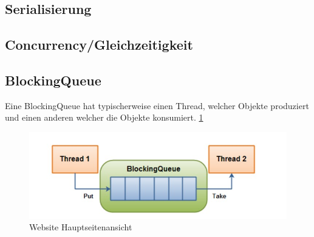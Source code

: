 

\subsection{Serialisierung}

\subsection{Concurrency/Gleichzeitigkeit}



\subsection{BlockingQueue}

Eine BlockingQueue hat typischerweise einen Thread, welcher Objekte produziert und einen anderen welcher die Objekte konsumiert. \ref{fig:impl:BlockingQueue}

\begin{figure}
    \centering
    \includegraphics[scale=0.5]{pics/blockingQueue.jpg}
    \caption{Website Hauptseitenansicht}
    \label{fig:impl:BlockingQueue}
\end{figure}

